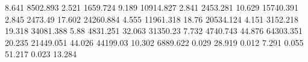 8.641      8502.893   %
2.521      1659.724   %
9.189      10914.827  %
2.841      2453.281   %
10.629     15740.391  %
2.845      2473.49    %
17.602     24260.884  %
4.555      11961.318  %
18.76      20534.124  %
4.151      3152.218   %
19.318     34081.388  %
5.88       4831.251   %
32.063     31350.23   %
7.732      4740.743   %
44.876     64303.351  %
20.235     21449.051  %
44.026     44199.03   %
10.302     6889.622   %
0.029      28.919     %
0.012      7.291      %
0.055      51.217     %
0.023      13.284     %
